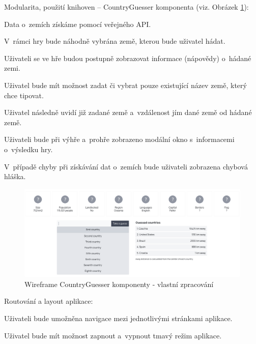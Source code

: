 \begin{citemize}
	\item Modularita, použití knihoven -- CountryGuesser komponenta (viz. Obrázek \ref{fig:countryguesserwireframe}):
	
	\begin{cenumerate}
		\item Data o~zemích získáme pomocí veřejného API.
		\item V~rámci hry bude náhodně vybrána země, kterou bude uživatel hádat.
		\item Uživateli se ve hře budou postupně zobrazovat informace (nápovědy) o~hádané zemi.
		\item Uživatel bude mít možnost zadat či vybrat pouze existující název země, který chce tipovat.
		\item Uživatel následně uvidí již zadané země a~vzdálenost jím dané země od hádané země.
		\item Uživateli bude při výhře a~prohře zobrazeno modální okno s~informacemi o~výsledku hry.
		\item V~případě chyby při získávání dat o~zemích bude uživateli zobrazena chybová hláška.
	\end{cenumerate}

	\begin{figure}[htb]
		\centering
			\includegraphics[width=1\textwidth]{images/CountryGuesser-wireframe.png}
		\caption[Wireframe CountryGuesser komponenty]{Wireframe CountryGuesser komponenty - vlastní zpracování}
		\label{fig:countryguesserwireframe}
	\end{figure}

	\item Routování a layout aplikace:
	
	\begin{cenumerate}
		\item Uživateli bude umožněna navigace mezi jednotlivými stránkami aplikace.
		\item Uživatel bude mít možnost zapnout a~vypnout tmavý režim aplikace.
	\end{cenumerate}
\end{citemize}

